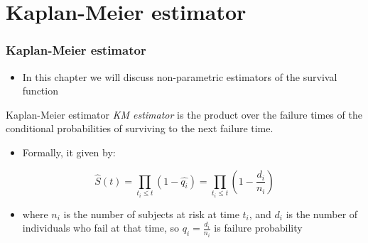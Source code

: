 \documentclass{beamer}
\newcommand{\empr}[1]{{\emph{\color{red}#1}}}
\begin{document}
\section{Kaplan-Meier estimator}
\begin{frame}
\frametitle{Kaplan-Meier estimator}
\begin{itemize}
\item  In this chapter we will discuss non-parametric estimators of the survival function
\end{itemize}

\begin{defblock}{Kaplan-Meier estimator}
\empr{KM estimator} is the product over the failure times of the conditional probabilities of surviving to the next failure time.
\end{defblock}

\begin{itemize}
\item Formally, it given by:
\end{itemize}

\begin{equation}
\hat{S}(t)=\prod\limits_{t_i\le t}^{}(1-\hat{q_i})=\prod\limits_{t_i\le t}^{}(1 - \frac{d_i}{n_i})
\end{equation}

\begin{itemize}
	\item where $n_i$ is the number of subjects {\color{red} at risk} at time $t_i$, and $d_i$ is the number of {\color{red} individuals who fail} at that time, so $q_i = \frac{d_i}{n_i}$ is {\color{red}failure probability}
\end{itemize}	
\end{frame}
\end{document}
